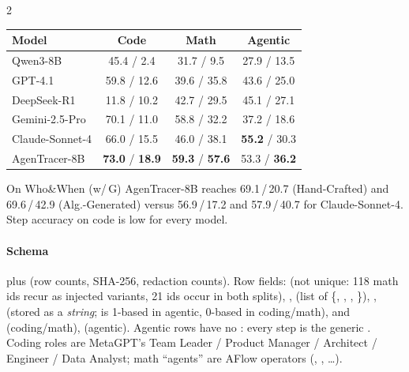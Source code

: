 \begin{multicols}{2}
\begin{center}\small
\begin{tabular}{@{}lccc@{}}\toprule
Model & Code & Math & Agentic\\\midrule
Qwen3-8B & 45.4 / 2.4 & 31.7 / 9.5 & 27.9 / 13.5\\
GPT-4.1 & 59.8 / 12.6 & 39.6 / 35.8 & 43.6 / 25.0\\
DeepSeek-R1 & 11.8 / 10.2 & 42.7 / 29.5 & 45.1 / 27.1\\
Gemini-2.5-Pro & 70.1 / 11.0 & 58.8 / 32.2 & 37.2 / 18.6\\
Claude-Sonnet-4 & 66.0 / 15.5 & 46.0 / 38.1 & \textbf{55.2} / 30.3\\
AgenTracer-8B & \textbf{73.0} / \textbf{18.9} & \textbf{59.3} / \textbf{57.6} & 53.3 / \textbf{36.2}\\\bottomrule
\end{tabular}
\end{center}
On Who\&When (w/\,G) AgenTracer-8B reaches 69.1\,/\,20.7 (Hand-Crafted) and 69.6\,/\,42.9 (Alg.-Generated) versus 56.9\,/\,17.2 and 57.9\,/\,40.7 for Claude-Sonnet-4. Step accuracy on code is low for every model.

\paragraph{Schema}  plus  (row counts, SHA-256, redaction counts). Row fields:  (not unique: 118 math ids recur as injected variants, 21 ids occur in both splits), ,  (list of \{, , , \}), ,  (stored as a \emph{string};  is 1-based in agentic, 0-based in coding/math),  and  (coding/math),  (agentic). Agentic rows have no : every step is the generic . Coding roles are MetaGPT's Team Leader / Product Manager / Architect / Engineer / Data Analyst; math ``agents'' are AFlow operators (, , \ldots).
\end{multicols}

